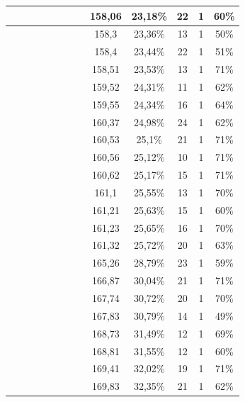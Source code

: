 \begin{center}
\begin{longtable}{|c|c|c|c|c|c|c|c|c|c|c|c|c|}
 \x &  &  &  \x &  \x &  &  \x &  & 158,06 & 23,18\% & 22 & 1 & 60\% \\ \hline
 \x &  \x &  &  \x &  &  &  &  & 158,3 & 23,36\% & 13 & 1 & 50\% \\ \hline
 \x &  &  &  \x &  &  &  \x &  \x & 158,4 & 23,44\% & 22 & 1 & 51\% \\ \hline
 \x &  &  &  &  &  \x &  \x &  & 158,51 & 23,53\% & 13 & 1 & 71\% \\ \hline
 \x &  \x &  \x &  \x &  \x &  &  \x &  \x & 159,52 & 24,31\% & 11 & 1 & 62\% \\ \hline
 \x &  &  \x &  \x &  &  &  \x &  & 159,55 & 24,34\% & 16 & 1 & 64\% \\ \hline
 \x &  &  \x &  \x &  \x &  &  \x &  \x & 160,37 & 24,98\% & 24 & 1 & 62\% \\ \hline
 \x &  \x &  &  \x &  \x &  \x &  &  \x & 160,53 & 25,1\% & 21 & 1 & 71\% \\ \hline
 \x &  &  &  &  \x &  \x &  \x &  \x & 160,56 & 25,12\% & 10 & 1 & 71\% \\ \hline
 \x &  \x &  \x &  \x &  \x &  \x &  \x &  & 160,62 & 25,17\% & 15 & 1 & 71\% \\ \hline
 \x &  &  \x &  \x &  \x &  \x &  \x &  & 161,1 & 25,55\% & 13 & 1 & 70\% \\ \hline
 \x &  &  &  \x &  \x &  &  &  & 161,21 & 25,63\% & 15 & 1 & 60\% \\ \hline
 \x &  &  \x &  &  \x &  \x &  \x &  \x & 161,23 & 25,65\% & 16 & 1 & 70\% \\ \hline
 \x &  &  \x &  &  \x &  &  \x &  & 161,32 & 25,72\% & 20 & 1 & 63\% \\ \hline
 \x &  &  &  \x &  \x &  &  \x &  \x & 165,26 & 28,79\% & 23 & 1 & 59\% \\ \hline
 \x &  &  &  \x &  \x &  \x &  \x &  & 166,87 & 30,04\% & 21 & 1 & 71\% \\ \hline
 \x &  &  &  \x &  &  \x &  \x &  & 167,74 & 30,72\% & 20 & 1 & 70\% \\ \hline
 \x &  &  &  \x &  &  &  \x &  & 167,83 & 30,79\% & 14 & 1 & 49\% \\ \hline
 \x &  \x &  &  \x &  \x &  \x &  \x &  & 168,73 & 31,49\% & 12 & 1 & 69\% \\ \hline
 \x &  \x &  &  \x &  \x &  &  \x &  & 168,81 & 31,55\% & 12 & 1 & 60\% \\ \hline
 \x &  \x &  \x &  &  \x &  \x &  \x &  \x & 169,41 & 32,02\% & 19 & 1 & 71\% \\ \hline
 \x &  \x &  \x &  \x &  \x &  &  \x &  & 169,83 & 32,35\% & 21 & 1 & 62\% \\ \hline

\end{longtable}
\end{center}
